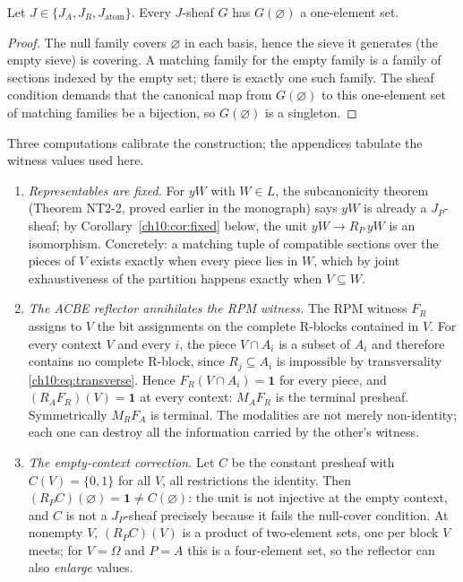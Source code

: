 \begin{lemma}
\label{ch10:lem:emptyterminal}
Let $J \in \{J_A, J_R, J_{\mathrm{atom}}\}$. Every $J$-sheaf $G$ has
$G(\varnothing)$ a one-element set.
\end{lemma}

\begin{proof}
The null family covers $\varnothing$ in each basis, hence the sieve it
generates (the empty sieve) is covering. A matching family for the empty
family is a family of sections indexed by the empty set; there is exactly one
such family. The sheaf condition demands that the canonical map from
$G(\varnothing)$ to this one-element set of matching families be a bijection,
so $G(\varnothing)$ is a singleton.
\end{proof}

\begin{example}
\label{ch10:ex:action}
Three computations calibrate the construction; the appendices tabulate the
witness values used here.
\begin{enumerate}
\item \emph{Representables are fixed.} For $yW$ with $W \in L$, the
subcanonicity theorem (Theorem NT2-2, proved earlier in the monograph) says
$yW$ is already a $J_P$-sheaf; by Corollary~\ref{ch10:cor:fixed} below, the
unit $yW \to R_P\, yW$ is an isomorphism. Concretely: a matching tuple of
compatible sections over the pieces of $V$ exists exactly when every piece
lies in $W$, which by joint exhaustiveness of the partition happens exactly
when $V \subseteq W$.
\item \emph{The ACBE reflector annihilates the RPM witness.} The RPM witness
$F_R$ assigns to $V$ the bit assignments on the complete R-blocks contained
in $V$. For every context $V$ and every $i$, the piece $V \cap A_i$ is a
subset of $A_i$ and therefore contains no complete R-block, since
$R_j \subseteq A_i$ is impossible by transversality
\eqref{ch10:eq:transverse}. Hence $F_R(V \cap A_i) = \mathbf{1}$ for every
piece, and $(R_A F_R)(V) = \mathbf{1}$ at every context: $M_A F_R$ is the
terminal presheaf. Symmetrically $M_R F_A$ is terminal. The modalities are not
merely non-identity; each one can destroy all the information carried by the
other's witness.
\item \emph{The empty-context correction.} Let $C$ be the constant presheaf
with $C(V) = \{0, 1\}$ for all $V$, all restrictions the identity. Then
$(R_P C)(\varnothing) = \mathbf{1} \neq C(\varnothing)$: the unit is not
injective at the empty context, and $C$ is not a $J_P$-sheaf precisely because
it fails the null-cover condition. At nonempty $V$, $(R_P C)(V)$ is a product
of two-element sets, one per block $V$ meets; for $V = \Omega$ and $P = A$
this is a four-element set, so the reflector can also \emph{enlarge} values.
\end{enumerate}
\end{example}

